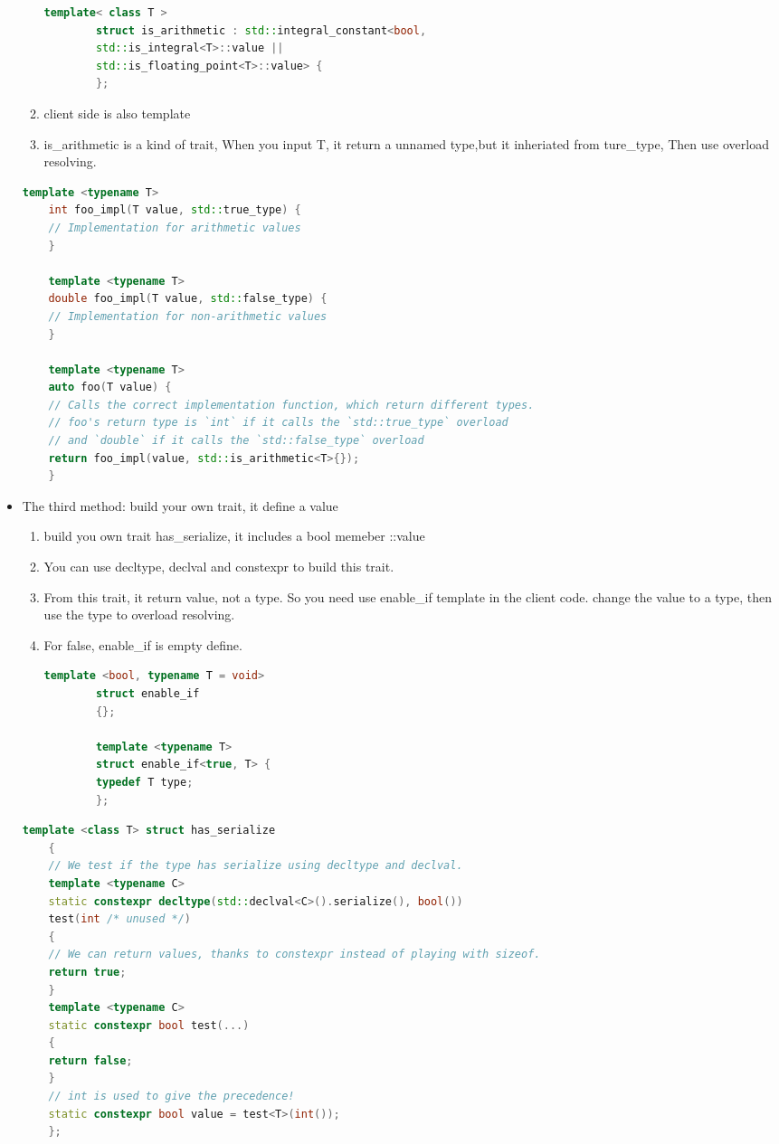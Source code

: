 \documentclass[a4paper,12pt,twoside]{book}
\begin{document}
\begin{itemize}
\begin{enumerate}
\begin{lstlisting}[frame=single, language=c++]
		template< class T >
		struct is_arithmetic : std::integral_constant<bool,
		std::is_integral<T>::value ||
		std::is_floating_point<T>::value> {
		};
		\end{lstlisting}
		
		\item client side is also template
		\item is\_arithmetic is a kind of trait, When you input T, it return a unnamed type,but it inheriated from ture\_type, Then use overload resolving.
	\end{enumerate}
	\begin{lstlisting}[frame=single, language=c++]
	template <typename T>
	int foo_impl(T value, std::true_type) {
	// Implementation for arithmetic values
	}
	
	template <typename T>
	double foo_impl(T value, std::false_type) {
	// Implementation for non-arithmetic values
	}
	
	template <typename T>
	auto foo(T value) {
	// Calls the correct implementation function, which return different types.
	// foo's return type is `int` if it calls the `std::true_type` overload
	// and `double` if it calls the `std::false_type` overload
	return foo_impl(value, std::is_arithmetic<T>{});
	}
	\end{lstlisting}
	
	\item The third method: build your own trait, it define a value
	\begin{enumerate}
		\item build you own trait has\_serialize, it includes a bool memeber ::value
		\item You can use decltype, declval and constexpr to build this trait. 
		\item From this trait, it return value, not a type. So you need use enable\_if template in the client code. change the value to a type, then use the type to overload resolving.
		\item For false, enable\_if is empty define.
		\begin{lstlisting}[frame=single, language=c++]
		template <bool, typename T = void>
		struct enable_if
		{};
		
		template <typename T>
		struct enable_if<true, T> {
		typedef T type;
		};
		\end{lstlisting}
	\end{enumerate}
	\begin{lstlisting}[frame=single, language=c++]
	template <class T> struct has_serialize
	{
	// We test if the type has serialize using decltype and declval.
	template <typename C>
	static constexpr decltype(std::declval<C>().serialize(), bool())
	test(int /* unused */)
	{
	// We can return values, thanks to constexpr instead of playing with sizeof.
	return true;
	}
	template <typename C>
	static constexpr bool test(...)
	{
	return false;
	}
	// int is used to give the precedence!
	static constexpr bool value = test<T>(int());
	};
	

\end{lstlisting}
\end{itemize}
\end{document}
